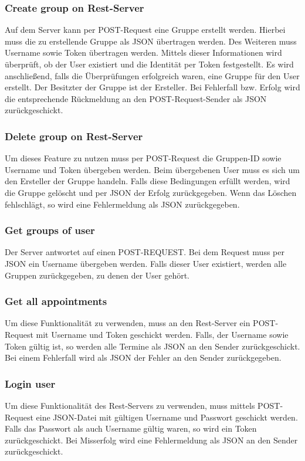 \documentclass[12pt]{scrartcl}
\begin{document}
    \subsubsection{Create group on Rest-Server}
        Auf dem Server kann per POST-Request eine Gruppe erstellt werden.
        Hierbei muss die zu erstellende Gruppe als JSON übertragen werden.
        Des Weiteren muss Username sowie Token übertragen werden.
        Mittels dieser Informationen wird überprüft, ob der User existiert und die Identität 
        per Token festgestellt. Es wird anschließend, falls die Überprüfungen erfolgreich waren,
        eine Gruppe für den User erstellt. Der Besitzter der Gruppe ist der Ersteller.
        Bei Fehlerfall bzw. Erfolg wird die entsprechende Rückmeldung an den POST-Request-Sender 
        als JSON zurückgeschickt.

    \subsubsection{Delete group on Rest-Server}
        Um dieses Feature zu nutzen muss per POST-Request die Gruppen-ID sowie Username und Token übergeben werden.
        Beim übergebenen User muss es sich um den Ersteller der Gruppe handeln.
        Falls diese Bedingungen erfüllt werden, wird die Gruppe gelöscht und per JSON der Erfolg zurückgegeben.
        Wenn das Löschen fehlschlägt, so wird eine Fehlermeldung als JSON zurückgegeben. 

    \subsubsection{Get groups of user}
        Der Server antwortet auf einen POST-REQUEST. Bei dem Request muss per JSON ein Username übergeben werden.
        Falls dieser User existiert, werden alle Gruppen zurückgegeben, zu denen der User gehört.
        
    \subsubsection{Get all appointments}
        Um diese Funktionalität zu verwenden, muss an den Rest-Server ein POST-Request mit Username und Token geschickt werden.
        Falls, der Username sowie Token gültig ist, so werden alle Termine als JSON an den Sender zurückgeschickt.
        Bei einem Fehlerfall wird als JSON der Fehler an den Sender zurückgegeben.
    
    \subsubsection{Login user}
        Um diese Funktionalität des Rest-Servers zu verwenden, muss mittels POST-Request eine 
        JSON-Datei mit gültigen Username und Passwort geschickt werden.
        Falls das Passwort als auch Username gültig waren, so wird ein Token zurückgeschickt.
        Bei Misserfolg wird eine Fehlermeldung als JSON an den Sender zurückgeschickt.
\end{document}
